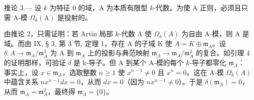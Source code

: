 推论 3.--- 设 \(k\) 为特征 0 的域，A 为本质有限型 \(k\)-代数。为使 A 正则，必须且只需 A-模 \(\Omega_{k}(\mathrm{A})\) 是投射的。

由推论 2，只需证明：若 Artin 局部 \(k\)-代数 A 使 \(\Omega_k(A)\) 为自由 A-模，则 A 是域。而由 IX, § 3, 第 3 节, 定理 1，存在 A 的子域 K 使 \(A = K \oplus \mathfrak{m}_A\)。设 \(\delta: A \to \mathfrak{m}_A / \mathfrak{m}_A^2\) 为 A 到 \(\mathfrak{m}_A\) 上的投影与典范映射 \(\mathfrak{m}_A \to \mathfrak{m}_A / \mathfrak{m}_A^2\) 的复合。如引理 4 的证明那样，可验证 \(\delta\) 是 k-导子。但 A 到某个 A-模的每个 \(k\)-导子都零化 \(\mathfrak{m}_A\)：事实上，设 \(x \in \mathfrak{m}_A\)，选取整数 \(n \geqslant 1\) 使 \(x^{n-1} \neq 0\) 且 \(x^n = 0\)。这在 A-模 \(\Omega_k(A)\) 中蕴含关系 \(nx^{n-1} dx = 0\)，从而 \(dx = 0\)（因为 \(nx^{n-1} \neq 0\)）。于是 \(\delta(\mathfrak{m}_A) = 0\)，从而 \(\mathfrak{m}_A = \mathfrak{m}_A^2\)，最终得 \(\mathfrak{m}_A = \{0\}\)。


